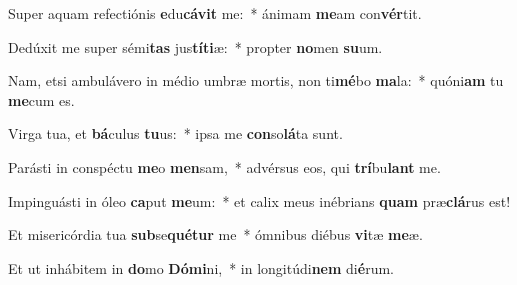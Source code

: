 \item Super aquam refectiónis \textbf{e}du\textbf{cá}\textbf{vit} me:~* ánimam \textbf{me}am con\textbf{vér}tit.
\item Dedúxit me super sémi\textbf{tas} jus\textbf{tí}\textbf{ti}æ:~* propter \textbf{no}men \textbf{su}um.
\item Nam, etsi ambulávero in médio umbræ mortis, non ti\textbf{mé}bo \textbf{ma}la:~* quóni\textbf{am} tu \textbf{me}cum es.
\item Virga tua, et \textbf{bá}culus \textbf{tu}us:~* ipsa me \textbf{con}so\textbf{lá}ta sunt.
\item Parásti in conspéctu \textbf{me}o \textbf{men}sam,~* advérsus eos, qui \textbf{trí}bu\textbf{lant} me.
\item Impinguásti in óleo \textbf{ca}put \textbf{me}um:~* et calix meus inébrians \textbf{quam} præ\textbf{clá}rus est!
\item Et misericórdia tua \textbf{sub}se\textbf{qué}\textbf{tur} me~* ómnibus diébus \textbf{vi}tæ \textbf{me}æ.
\item Et ut inhábitem in \textbf{do}mo \textbf{Dó}\textbf{mi}ni,~* in longitúdi\textbf{nem} di\textbf{é}rum.
